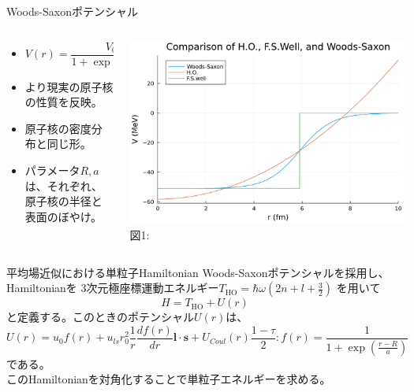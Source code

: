 \documentclass[aspectratio=169, 12pt, dvipdfmx]{beamer}
\begin{document}
\begin{frame}{Woods-Saxonポテンシャル}
  \begin{columns}[totalwidth=1.0\linewidth]
    \begin{column}[t]{0.45\linewidth}
      \begin{itemize}
        \item $V(r)=\dfrac{V_0(< 0)}{1+\exp((r-R)/a)}$
        \item より現実の原子核の性質を反映。
        \item 原子核の密度分布と同じ形。
        \item パラメータ$R,a$は、それぞれ、原子核の半径と表面のぼやけ。
      \end{itemize}
    \end{column}

    \begin{column}[T]{0.55\linewidth}
      \centering
      \includegraphics[width=\textwidth]{Comp_pt.pdf}
      \vspace{5pt} %
      \scriptsize 図1:
  \end{column}
  \end{columns}
\end{frame}

\begin{frame}{平均場近似における単粒子Hamiltonian}
  Woods-Saxonポテンシャルを採用し、Hamiltonianを
  3次元極座標運動エネルギー$T_{\text{HO}}=\hbar\omega\left(2n+l+\frac{3}{2}\right)$
  を用いて
  \begin{equation}
    H=T_{\text{HO}}+U(r)
  \end{equation}
  と定義する。このときのポテンシャル$U(r)$は、
  \begin{equation}
    U(r)=u_0f(r)+u_{ls}r_0^2\dfrac{1}{r}\dfrac{df(r)}{dr}\boldsymbol{l}\cdot\boldsymbol{s}+U_{Coul}(r)\dfrac{1-\tau}{2}:f(r)=\dfrac{1}{1+\exp\left(\frac{r-R}{a}\right)}
  \end{equation}
  である。\\
  このHamiltonianを対角化することで単粒子エネルギーを求める。
\end{frame}
\end{document}
